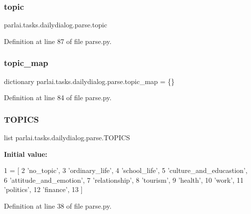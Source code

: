 \subsubsection{\texorpdfstring{topic}{topic}}
{\footnotesize\ttfamily parlai.\+tasks.\+dailydialog.\+parse.\+topic}



Definition at line 87 of file parse.\+py.

\mbox{\label{namespaceparlai_1_1tasks_1_1dailydialog_1_1parse_a1257c1312ee37cbf84fd9892736a6282}} 
\subsubsection{\texorpdfstring{topic\+\_\+map}{topic\_map}}
{\footnotesize\ttfamily dictionary parlai.\+tasks.\+dailydialog.\+parse.\+topic\+\_\+map = \{\}}



Definition at line 84 of file parse.\+py.

\mbox{\label{namespaceparlai_1_1tasks_1_1dailydialog_1_1parse_a567cf2e7cf2a587676683cf7a0860ac9}} 
\subsubsection{\texorpdfstring{T\+O\+P\+I\+CS}{TOPICS}}
{\footnotesize\ttfamily list parlai.\+tasks.\+dailydialog.\+parse.\+T\+O\+P\+I\+CS}

{\bfseries Initial value\+:}
\begin{DoxyCode}
1 =  [
2     \textcolor{stringliteral}{'no\_topic'},
3     \textcolor{stringliteral}{'ordinary\_life'},
4     \textcolor{stringliteral}{'school\_life'},
5     \textcolor{stringliteral}{'culture\_and\_educastion'},
6     \textcolor{stringliteral}{'attitude\_and\_emotion'},
7     \textcolor{stringliteral}{'relationship'},
8     \textcolor{stringliteral}{'tourism'},
9     \textcolor{stringliteral}{'health'},
10     \textcolor{stringliteral}{'work'},
11     \textcolor{stringliteral}{'politics'},
12     \textcolor{stringliteral}{'finance'},
13 ]
\end{DoxyCode}


Definition at line 38 of file parse.\+py.

